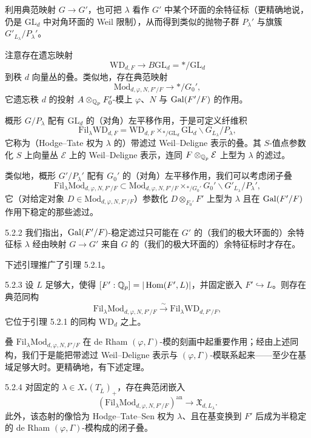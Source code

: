 利用典范映射 $G\to G'$，也可把 $\lambda$ 看作 $G'$ 中某个环面的余特征标（更精确地说，仍是 $\mathrm{GL}_d$ 中对角环面的 Weil 限制），从而得到类似的抛物子群 $P_\lambda'$ 与旗簇 $G'_{L_\lambda}/P_\lambda'$。

注意存在遗忘映射
\[
\mathrm{WD}_{d,F}\longrightarrow B\mathrm{GL}_d=*/\mathrm{GL}_d
\]
到秩 $d$ 向量丛的叠。类似地，存在典范映射
\[
\mathrm{Mod}_{d,\varphi,N,F'/F}\longrightarrow */G_0',
\]
它遗忘秩 $d$ 的投射 $A\otimes_{\mathbb{Q}_p}F_0'$-模上 $\varphi$、$N$ 与 $\operatorname{Gal}(F'/F)$ 的作用。

概形 $G/P_\lambda$ 配有 $\mathrm{GL}_d$ 的（对角）左平移作用，于是可定义纤维积
\[
\mathrm{Fil}_\lambda\mathrm{WD}_{d,F}=\mathrm{WD}_{d,F}\times_{*/\mathrm{GL}_d}\mathrm{GL}_d\backslash G_{L_\lambda}/P_\lambda,
\]
它称为（Hodge--Tate 权为 $\lambda$ 的）带滤过 Weil--Deligne 表示的叠。其 $S$-值点参数化 $S$ 上向量丛 $\mathcal{E}$ 上的 Weil--Deligne 表示，连同 $F\otimes_{\mathbb{Q}_p}\mathcal{E}$ 上型为 $\lambda$ 的滤过。

类似地，概形 $G'/P_\lambda'$ 配有 $G_0'$ 的（对角）左平移作用，我们可以考虑闭子叠
{\small
\[
\mathrm{Fil}_\lambda\mathrm{Mod}_{d,\varphi,N,F'/F}\subset\mathrm{Mod}_{d,\varphi,N,F'/F}\times_{*/G_0'}G_0'\backslash G'_{L_\lambda}/P_\lambda',
\]}
它（对给定对象 $D\in\mathrm{Mod}_{d,\varphi,N,F'/F}$）参数化 $D\otimes_{F_0'}F'$ 上型为 $\lambda$ 且在 $\operatorname{Gal}(F'/F)$ 作用下稳定的那些滤过。

\begin{rem}{5.2.2}
我们指出，$\operatorname{Gal}(F'/F)$-稳定滤过只可能在 $G'$ 的（我们的极大环面的）余特征标 $\lambda$ 经由映射 $G\to G'$ 来自 $G$ 的（我们的极大环面的）余特征标时才存在。
\label{thm:a4-5-2-2}
\end{rem}

下述引理推广了引理 5.2.1。

\begin{lem}{5.2.3}
设 $L$ 足够大，使得 $[F':\mathbb{Q}_p]=|\operatorname{Hom}(F',L)|$，并固定嵌入 $F'\hookrightarrow L$。则存在典范同构
\[
\mathrm{Fil}_\lambda\mathrm{Mod}_{d,\varphi,N,F'/F}\xrightarrow{\ \sim\ }\mathrm{Fil}_\lambda\mathrm{WD}_{d,F'/F},
\]
它位于引理 5.2.1 的同构 $\mathrm{WD}_d$ 之上。
\label{thm:a4-5-2-3}
\end{lem}

叠 $\mathrm{Fil}_\lambda\mathrm{Mod}_{d,\varphi,N,F'/F}$ 在 de Rham $(\varphi,\Gamma)$-模的刻画中起重要作用；经由上述同构，我们于是能把带滤过 Weil--Deligne 表示与 $(\varphi,\Gamma)$-模联系起来——至少在基域足够大时。更精确地，有下述定理。

\begin{thm}{5.2.4}
对固定的 $\lambda\in X_*(T_{\bar L})_+$，存在典范闭嵌入
\[
(\mathrm{Fil}_\lambda\mathrm{Mod}_{d,\varphi,N,F'/F})^{\mathrm{an}}\longrightarrow\mathfrak{X}_{d,L_\lambda}.
\]
此外，该态射的像恰为 Hodge--Tate--Sen 权为 $\lambda$、且在基变换到 $F'$ 后成为半稳定的 de Rham $(\varphi,\Gamma)$-模构成的闭子叠。
\label{thm:a4-5-2-4}
\end{thm}

